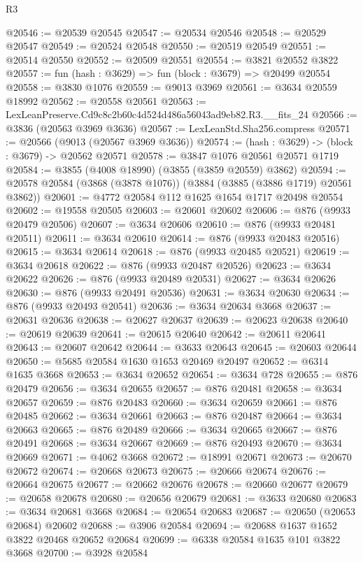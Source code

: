 \begin{lexlean}{R3}
\begin{coremodule}
@20546 := @20539 @20545
@20547 := @20534 @20546
@20548 := @20529 @20547
@20549 := @20524 @20548
@20550 := @20519 @20549
@20551 := @20514 @20550
@20552 := @20509 @20551
@20554 := @3821 @20552 @3822
@20557 := fun (hash : @3629) => fun (block : @3679) => @20499 @20554
@20558 := @3830 @1076
@20559 := @9013 @3969
@20561 := @3634 @20559 @18992
@20562 := @20558 @20561
@20563 := LexLeanPreserve.Cd9c8c2b60c4d524d486a56043ad9eb82.R3.__fits_24
@20566 := @3836 (@20563 @3969 @3636)
@20567 := LexLeanStd.Sha256.compress
@20571 := @20566 (@9013 (@20567 @3969 @3636))
@20574 := (hash : @3629) -> (block : @3679) -> @20562 @20571
@20578 := @3847 @1076 @20561 @20571 @1719
@20584 := @3855 (@4008 @18990) (@3855 (@3859 @20559) @3862)
@20594 := @20578 @20584 (@3868 (@3878 @1076)) (@3884 (@3885 (@3886 @1719) @20561 @3862))
@20601 := @4772 @20584 @112 @1625 @1654 @1717 @20498 @20554
@20602 := @19558 @20505
@20603 := @20601 @20602
@20606 := @876 (@9933 @20479 @20506)
@20607 := @3634 @20606
@20610 := @876 (@9933 @20481 @20511)
@20611 := @3634 @20610
@20614 := @876 (@9933 @20483 @20516)
@20615 := @3634 @20614
@20618 := @876 (@9933 @20485 @20521)
@20619 := @3634 @20618
@20622 := @876 (@9933 @20487 @20526)
@20623 := @3634 @20622
@20626 := @876 (@9933 @20489 @20531)
@20627 := @3634 @20626
@20630 := @876 (@9933 @20491 @20536)
@20631 := @3634 @20630
@20634 := @876 (@9933 @20493 @20541)
@20636 := @3634 @20634 @3668
@20637 := @20631 @20636
@20638 := @20627 @20637
@20639 := @20623 @20638
@20640 := @20619 @20639
@20641 := @20615 @20640
@20642 := @20611 @20641
@20643 := @20607 @20642
@20644 := @3633 @20643
@20645 := @20603 @20644
@20650 := @5685 @20584 @1630 @1653 @20469 @20497
@20652 := @6314 @1635 @3668
@20653 := @3634 @20652
@20654 := @3634 @728
@20655 := @876 @20479
@20656 := @3634 @20655
@20657 := @876 @20481
@20658 := @3634 @20657
@20659 := @876 @20483
@20660 := @3634 @20659
@20661 := @876 @20485
@20662 := @3634 @20661
@20663 := @876 @20487
@20664 := @3634 @20663
@20665 := @876 @20489
@20666 := @3634 @20665
@20667 := @876 @20491
@20668 := @3634 @20667
@20669 := @876 @20493
@20670 := @3634 @20669
@20671 := @4062 @3668
@20672 := @18991 @20671
@20673 := @20670 @20672
@20674 := @20668 @20673
@20675 := @20666 @20674
@20676 := @20664 @20675
@20677 := @20662 @20676
@20678 := @20660 @20677
@20679 := @20658 @20678
@20680 := @20656 @20679
@20681 := @3633 @20680
@20683 := @3634 @20681 @3668
@20684 := @20654 @20683
@20687 := @20650 (@20653 @20684) @20602
@20688 := @3906 @20584
@20694 := @20688 @1637 @1652 @3822 @20468 @20652 @20684
@20699 := @6338 @20584 @1635 @101 @3822 @3668
@20700 := @3928 @20584

\end{coremodule}
\end{lexlean}
